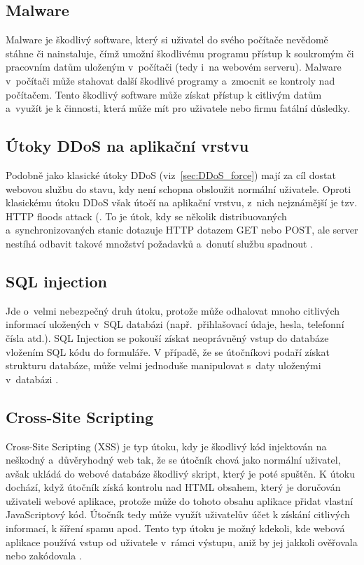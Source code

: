 \subsection*{Malware}
Malware je škodlivý software, který si uživatel do svého počítače nevědomě stáhne či nainstaluje, čímž umožní škodlivému programu přístup k soukromým či pracovním datům uloženým v~počítači (tedy i~na webovém serveru). Malware v~počítači může stahovat další škodlivé programy a~zmocnit se kontroly nad počítačem. Tento škodlivý software může získat přístup k citlivým datům a~využít je k činnosti, která může mít pro uživatele nebo firmu fatální důsledky.

\subsection*{Útoky DDoS na aplikační vrstvu}
Podobně jako klasické útoky DDoS (viz~\ref{sec:DDoS_force}) mají za cíl dostat webovou službu do stavu, kdy není schopna obsloužit normální uživatele. Oproti klasickému útoku DDoS však útočí na aplikační vrstvu, z~nich nejznámější je tzv. HTTP floods attack (. To je útok, kdy se několik distribuovaných a~synchronizovaných stanic dotazuje HTTP dotazem GET nebo POST, ale server nestíhá odbavit takové množství požadavků a~donutí službu spadnout \cite{bib:HTTP_flood}.

\subsection*{SQL injection}
Jde o~velmi nebezpečný druh útoku, protože může odhalovat mnoho citlivých informací uložených v~SQL databázi (např.~přihlašovací údaje, hesla, telefonní čísla atd.). SQL Injection se pokouší získat neoprávněný vstup do databáze vložením SQL kódu do formuláře. V případě, že se útočníkovi podaří získat strukturu databáze, může velmi jednoduše manipulovat s~daty uloženými v~databázi \cite{bib:SQL_injection}.

\subsection*{Cross-Site Scripting}
Cross-Site Scripting (XSS) je typ útoku, kdy je škodlivý kód injektován na neškodný a~důvěryhodný web tak, že se útočník chová jako normální uživatel, avšak ukládá do webové databáze škodlivý skript, který je poté spuštěn. K útoku dochází, když útočník získá kontrolu nad HTML obsahem, který je doručován uživateli webové aplikace, protože může do tohoto obsahu aplikace přidat vlastní JavaScriptový kód. Útočník tedy může využít uživatelův účet k získání citlivých informací, k šíření spamu apod. Tento typ útoku je možný kdekoli, kde webová aplikace používá vstup od uživatele v~rámci výstupu, aniž by jej jakkoli ověřovala nebo zakódovala \cite{bib:XSS, bib:XSS_vut}.

